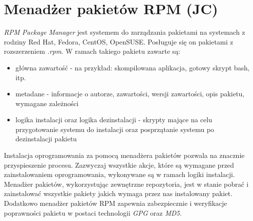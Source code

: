 \section{Menadżer pakietów RPM (JC)}
\emph{RPM Package Manager} jest systemem do zarządzania pakietami na systemach z rodziny Red Hat, Fedora, CentOS, OpenSUSE. Posługuje się on pakietami z rozszerzeniem \emph{.rpm}. W ramach takiego pakietu zawarte są:
\begin{itemize}
    \item główna zawartość - na przykład: skompilowana aplikacja, gotowy skrypt bash, itp.
    \item metadane - informacje o autorze, zawartości, wersji zawartości, opis pakietu, wymagane zależności
    \item logika instalacji oraz logika dezinstalacji - skrypty mające na celu przygotowanie systemu do instalacji oraz posprzątanie systemu po dezinstalacji pakietu
\end{itemize}

Instalacja oprogramowania za pomocą menadżera pakietów pozwala na znacznie przyspieszenie procesu. Zazwyczaj wszystkie akcje, które są wymagane przed zainstalowaniem oprogramowania, wykonywane są w ramach logiki instalacji. Menadżer pakietów, wykorzystując zewnętrzne repozytoria, jest w stanie pobrać i zainstalować wszystkie pakiety jakich wymaga przez nas instalowany pakiet. Dodatkowo menadżer pakietów RPM zapewnia zabezpiecznie i weryfikacje poprawności pakietu w postaci technologii \emph{GPG} oraz  \emph{MD5}.

